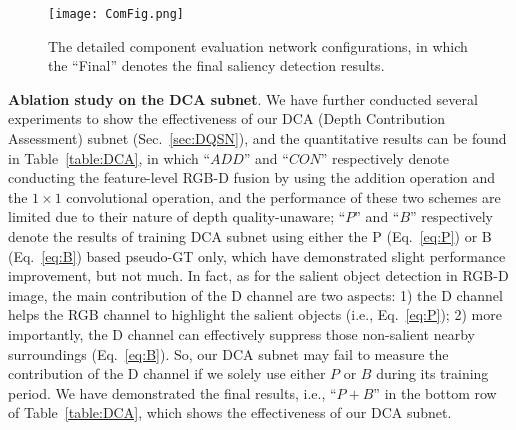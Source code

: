\documentclass[journal]{IEEEtran}
\begin{document}
\begin{figure*}\begin{center}
\texttt{[image: ComFig.png]}
\end{center}
   \caption{The detailed component evaluation network configurations, in which the ``Final'' denotes the final saliency detection results.}
\label{fig:ComFig}
\end{figure*}

\textbf{Ablation study on the DCA subnet}.
We have further conducted several experiments to show the effectiveness of our DCA (Depth Contribution Assessment) subnet (Sec.~\ref{sec:DQSN}), and the quantitative results can be found in Table~\ref{table:DCA}, in which ``$ADD$'' and ``$CON$'' respectively denote conducting the feature-level RGB-D fusion by using the addition operation and the $1\times 1$ convolutional operation, and the performance of these two schemes are limited due to their nature of depth quality-unaware;
``$P$'' and ``$B$'' respectively denote the results of training DCA subnet using either the P (Eq.~\ref{eq:P}) or B (Eq.~\ref{eq:B}) based pseudo-GT only, which have demonstrated slight performance improvement, but not much.
In fact, as for the salient object detection in RGB-D image, the main contribution of the D channel are two aspects: 1) the D channel helps the RGB channel to highlight the salient objects (i.e., Eq.~\ref{eq:P}); 2) more importantly, the D channel can effectively suppress those non-salient nearby surroundings (Eq.~\ref{eq:B}).
So, our DCA subnet may fail to measure the contribution of the D channel if we solely use either $P$ or $B$ during its training period.
We have demonstrated the final results, i.e., ``$P+B$'' in the bottom row of Table~\ref{table:DCA}, which shows the effectiveness of our DCA subnet.


\begin{table*}[t]
\begin{center}
\caption{Quantitative evidence towards the effectiveness of the component B (Eq.~\ref{eq:B}).}
  \vspace{0.1cm}
\end{center}
\end{table*}
\end{document}
